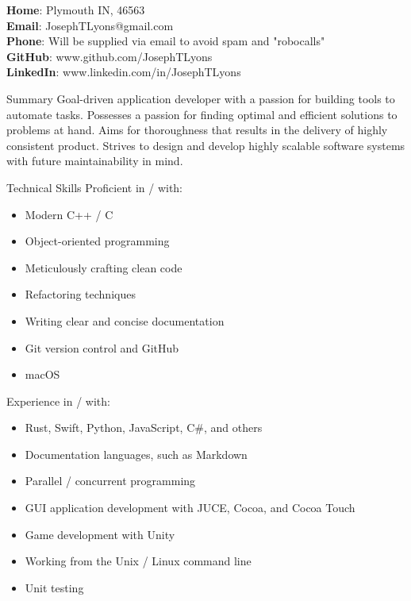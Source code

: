 \documentclass{Joseph_T_Lyons_Resume}
\newenvironment{tightlySpacedList}
{ \begin{itemize}
    \setlength{\itemsep}{0pt}
    \setlength{\parskip}{0pt}
    \setlength{\parsep}{0pt}     }
{ \end{itemize}                  }
\begin{document}
\textbf{Home}: Plymouth IN, 46563
\\\textbf{Email}: JosephTLyons@gmail.com
\\\textbf{Phone}: Will be supplied via email to avoid spam and "robocalls"
\\\textbf{GitHub}: www.github.com/JosephTLyons
\\\textbf{LinkedIn}: www.linkedin.com/in/JosephTLyons

\begin{rSection}{Summary}
Goal-driven application developer with a passion for building tools to automate
tasks.  Possesses a passion for finding optimal and efficient solutions to
problems at hand.  Aims for thoroughness that results in the delivery of highly
consistent product.  Strives to design and develop highly scalable software
systems with future maintainability in mind.
\end{rSection}

\begin{rSection}{Technical Skills}
Proficient in / with:

\begin{tightlySpacedList}
    \item Modern C++ / C
    \item Object-oriented programming
    \item Meticulously crafting clean code
    \item Refactoring techniques
    \item Writing clear and concise documentation
    \item Git version control and GitHub
    \item macOS
\end{tightlySpacedList}

Experience in / with:
\begin{tightlySpacedList}
    \item Rust, Swift, Python, JavaScript, C\#, and others
    \item Documentation languages, such as Markdown
    \item Parallel / concurrent programming
    \item GUI application development with JUCE, Cocoa, and Cocoa Touch
    \item Game development with Unity
    \item Working from the Unix / Linux command line
    \item Unit testing
\end{tightlySpacedList}
\end{rSection}
\end{document}
